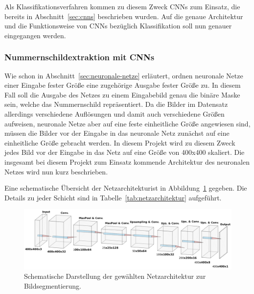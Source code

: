Als Klassifikationsverfahren kommen zu diesem Zweck CNNs zum Einsatz,
die bereits in Abschnitt~\ref{sec:cnns} beschrieben wurden.
Auf die genaue Architektur und die Funktionsweise von CNNs bez\"uglich
Klassifikation soll nun genauer eingegangen werden.

\subsubsection{Nummernschildextraktion mit CNNs}

Wie schon in Abschnitt~\ref{sec:neuronale-netze} erl\"autert, ordnen
neuronale Netze einer Eingabe fester Gr\"o{\ss}e eine zugeh\"orige
Ausgabe fester Gr\"o{\ss}e zu.
In diesem Fall soll die Ausgabe des Netzes zu einem Eingabebild
genau die bin\"are Maske sein, welche das Nummernschild repr\"asentiert.
Da die Bilder im Datensatz allerdings verschiedene Aufl\"osungen
und damit auch verschiedene Gr\"o{\ss}en aufweisen, neuronale Netze
aber auf eine feste einheitliche Gr\"o{\ss}e angewiesen sind,
m\"ussen die Bilder vor der Eingabe in das neuronale Netz
zun\"achst auf eine einheitliche Gr\"o{\ss}e gebracht werden.
In diesem Projekt wird zu diesem Zweck jedes Bild vor der Eingabe
in das Netz auf eine Gr\"o{\ss}e von 400x400 skaliert.
Die insgesamt bei diesem Projekt zum Einsatz kommende Architektur des
neuronalen Netzes wird nun kurz beschrieben.

Eine schematische \"Ubersicht der Netzarchitekturist in
Abbildung~\ref{fig:netzarchitektur} gegeben. Die Details zu jeder
Schicht sind in Tabelle~\ref{tab:netzarchitektur} aufgef\"uhrt.

\begin{figure}[h]
    \centering
    \includegraphics[width=\textwidth]{abbildungen/network_architecture}
    \caption{Schematische Darstellung der gew\"ahlten Netzarchitektur
        zur Bildsegmentierung.}
    \label{fig:netzarchitektur}
\end{figure}

